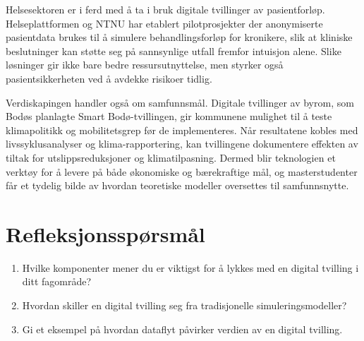 Helsesektoren er i ferd med å ta i bruk digitale tvillinger av pasientforløp. Helseplattformen og NTNU har etablert pilotprosjekter der anonymiserte pasientdata brukes til å simulere behandlingsforløp for kronikere, slik at kliniske beslutninger kan støtte seg på sannsynlige utfall fremfor intuisjon alene. Slike løsninger gir ikke bare bedre ressursutnyttelse, men styrker også pasientsikkerheten ved å avdekke risikoer tidlig.

Verdiskapingen handler også om samfunnsmål. Digitale tvillinger av byrom, som Bodøs planlagte Smart Bodø-tvillingen, gir kommunene mulighet til å teste klimapolitikk og mobilitetsgrep før de implementeres. Når resultatene kobles med livssyklusanalyser og klima-rapportering, kan tvillingene dokumentere effekten av tiltak for utslippsreduksjoner og klimatilpasning. Dermed blir teknologien et verktøy for å levere på både økonomiske og bærekraftige mål, og masterstudenter får et tydelig bilde av hvordan teoretiske modeller oversettes til samfunnsnytte.

\section{Refleksjonsspørsmål}
\begin{enumerate}
    \item Hvilke komponenter mener du er viktigst for å lykkes med en digital tvilling i ditt fagområde?
    \item Hvordan skiller en digital tvilling seg fra tradisjonelle simuleringsmodeller?
    \item Gi et eksempel på hvordan dataflyt påvirker verdien av en digital tvilling.
\end{enumerate}

